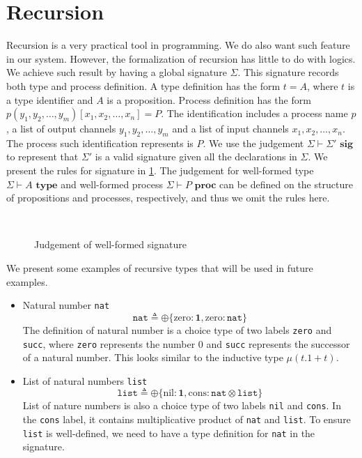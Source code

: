 \documentclass[12pt, openany]{memoir}
\begin{document}
\section{Recursion}
Recursion is a very practical tool in programming. We do also want such feature in our system.
However, the formalization of recursion has little to do with logics. We achieve such result by having a global signature $\Sigma$.
This signature records both type and process definition. A type definition has the form $t = A$, where 
$t$ is a type identifier and $A$ is a proposition. Process definition has the form $p (y_1, y_2, \ldots, y_m) [x_1, x_2, \ldots, x_n] = P$.
The identification includes a process name $p$, a list of output channels $y_1, y_2, \ldots, y_m$ and a list of input channels $x_1, x_2, \ldots, x_n$.
The process such identification represents is $P$. We use the judgement $\Sigma \vdash \Sigma' \textbf{ sig}$ to represent that
$\Sigma'$ is a valid signature given all the declarations in $\Sigma$. We present the rules for signature in \cref{fig:sig}. 
The judgement for well-formed type $\Sigma \vdash A \textbf{ type}$ and well-formed process $\Sigma \vdash P \textbf{ proc}$ can be defined on the structure
of propositions and processes, respectively, and thus we omit the rules here.
\begin{figure}[H]
  \centering
  \begin{rules}
    \qquad
    \\
  \end{rules}
  \caption{Judgement of well-formed signature}
  \label{fig:sig}
\end{figure}
We present some examples of recursive types that will be used in future examples.
\begin{itemize}
  \item Natural number \texttt{nat}
  \[
    \texttt{nat} \triangleq \oplus\{\text{zero} : \textbf{1}, \text{zero} : \texttt{nat}\}
  \]
  The definition of natural number is a choice type of two labels \texttt{zero} and \texttt{succ},
  where \texttt{zero} represents the number $0$ and \texttt{succ} represents the successor of a natural number.
  This looks similar to the inductive type $\mu(t.1 + t)$.
  \item List of natural numbers \texttt{list}
  \[
    \texttt{list} \triangleq \oplus\{\text{nil} : \textbf{1}, \text{cons} : \texttt{nat} \otimes \texttt{list}\}
  \]
  List of nature numbers is also a choice type of two labels \texttt{nil} and \texttt{cons}.
  In the \texttt{cons} label, it contains multiplicative product of \texttt{nat} and \texttt{list}.
  To ensure \texttt{list} is well-defined, we need to have a type definition for \texttt{nat} in the signature. 
\end{itemize}
\end{document}
